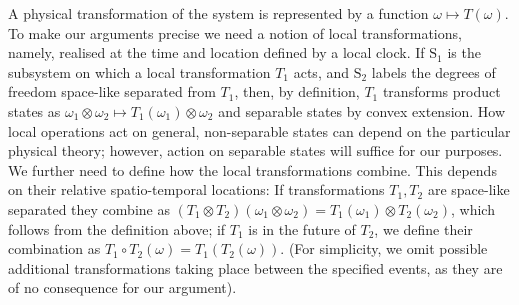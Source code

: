 \documentclass[a4paper,11pt]{article}
\begin{document}
A physical transformation of the system is represented by a function $\omega\mapsto T(\omega)$.
To make our arguments precise we need a notion of local transformations,  namely, realised at the time and location defined by a local clock. If $\mathrm S_1$ is the subsystem on which a local transformation $T_1$ acts, and $\mathrm S_2$ labels the degrees of freedom space-like separated from $T_1$, then, by definition, $T_1$ transforms product states as $\omega_1\otimes\omega_2\mapsto T_1(\omega_1)\otimes \omega_2$ and separable states by convex extension. How local operations act on general, non-separable states can depend on the particular physical theory; however, action on separable states will suffice for our purposes. We further need to define how the local transformations combine. This depends on their relative spatio-temporal locations: If  transformations $T_1, T_2$ are space-like separated they combine as $(T_1\otimes T_2)(\omega_1\otimes \omega_2) = T_1(\omega_1)\otimes T_2(\omega_2)$, which follows from the definition above; if $T_1$ is in the future of $T_2$, we define their combination as $T_1\circ T_2 (\omega) = T_1\left(T_2 (\omega) \right)$. (For simplicity, we omit possible additional transformations taking place between the specified events, as they are of no consequence for our argument).
\end{document}
